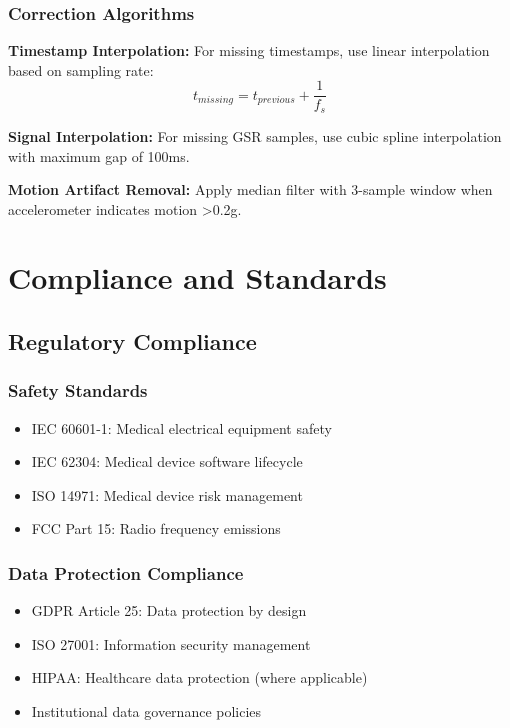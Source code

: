 \subsubsection{Correction Algorithms}

\textbf{Timestamp Interpolation:}
For missing timestamps, use linear interpolation based on sampling rate:
\begin{equation}
t_{missing} = t_{previous} + \frac{1}{f_s}
\end{equation}

\textbf{Signal Interpolation:}
For missing GSR samples, use cubic spline interpolation with maximum gap of 100ms.

\textbf{Motion Artifact Removal:}
Apply median filter with 3-sample window when accelerometer indicates motion >0.2g.

\section{Compliance and Standards}

\subsection{Regulatory Compliance}

\subsubsection{Safety Standards}

\begin{itemize}
\item IEC 60601-1: Medical electrical equipment safety
\item IEC 62304: Medical device software lifecycle
\item ISO 14971: Medical device risk management
\item FCC Part 15: Radio frequency emissions
\end{itemize}

\subsubsection{Data Protection Compliance}

\begin{itemize}
\item GDPR Article 25: Data protection by design
\item ISO 27001: Information security management
\item HIPAA: Healthcare data protection (where applicable)
\item Institutional data governance policies
\end{itemize}

